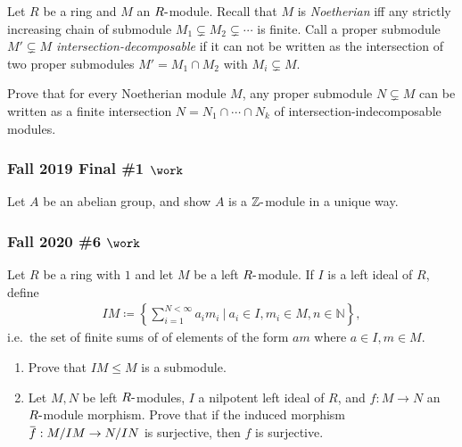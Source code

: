 Let \(R\) be a ring and \(M\) an \(R{\hbox{-}}\)module. Recall that
\(M\) is \emph{Noetherian} iff any strictly increasing chain of
submodule \(M_1 \subsetneq M_2 \subsetneq \cdots\) is finite. Call a
proper submodule \(M' \subsetneq M\) \emph{intersection-decomposable} if
it can not be written as the intersection of two proper submodules
\(M' = M_1\cap M_2\) with \(M_i \subsetneq M\).

Prove that for every Noetherian module \(M\), any proper submodule
\(N\subsetneq M\) can be written as a finite intersection
\(N = N_1 \cap\cdots \cap N_k\) of intersection-indecomposable modules.

\hypertarget{fall-2019-final-1-work}{%
\subsubsection{\texorpdfstring{Fall 2019 Final \#1
\(\work\)}{Fall 2019 Final \#1 \textbackslash work}}\label{fall-2019-final-1-work}}

Let \(A\) be an abelian group, and show \(A\) is a
\({\mathbb{Z}}{\hbox{-}}\)module in a unique way.

\hypertarget{fall-2020-6-work}{%
\subsubsection{\texorpdfstring{Fall 2020 \#6
\(\work\)}{Fall 2020 \#6 \textbackslash work}}\label{fall-2020-6-work}}

Let \(R\) be a ring with \(1\) and let \(M\) be a left
\(R{\hbox{-}}\)module. If \(I\) is a left ideal of \(R\), define
\begin{align*}
IM \coloneqq\left\{{ \sum_{i=1}^{N < \infty} a_i m_i {~\mathrel{\Big|}~}a_i \in I, m_i \in M, n\in {\mathbb{N}}}\right\}
,\end{align*}
i.e.~the set of finite sums of of elements of the form \(am\) where
\(a\in I, m\in M\).

\begin{enumerate}
\def\labelenumi{\alph{enumi}.}
\item
  Prove that \(IM \leq M\) is a submodule.
\item
  Let \(M, N\) be left \(R{\hbox{-}}\)modules, \(I\) a nilpotent left
  ideal of \(R\), and \(f: M\to N\) an \(R{\hbox{-}}\)module morphism.
  Prove that if the induced morphism
  \(\mkern 1.5mu\overline{\mkern-1.5muf\mkern-1.5mu}\mkern 1.5mu: M/IM \to N/IN\)
  is surjective, then \(f\) is surjective.
\end{enumerate}


